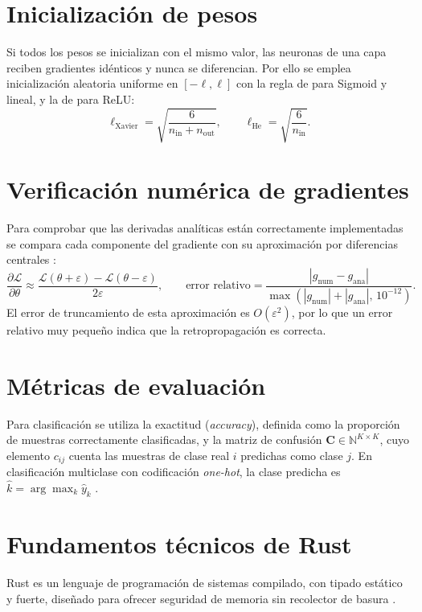 \section{Inicialización de pesos}
Si todos los pesos se inicializan con el mismo valor, las neuronas de una capa reciben gradientes idénticos y nunca se diferencian. Por ello se emplea inicialización aleatoria uniforme en $[-\ell,\ell]$ con la regla de \citet{glorot2010} para Sigmoid y lineal, y la de \citet{he2015} para ReLU:
\begin{equation}
\ell_{\text{Xavier}} = \sqrt{\frac{6}{n_{\text{in}}+n_{\text{out}}}}, \qquad \ell_{\text{He}} = \sqrt{\frac{6}{n_{\text{in}}}}.\label{eq:init}
\end{equation}

\section{Verificación numérica de gradientes}
Para comprobar que las derivadas analíticas están correctamente implementadas se compara cada componente del gradiente con su aproximación por diferencias centrales \citep{lecun1998,goodfellow2016}:
\begin{equation}
\frac{\partial\mathcal{L}}{\partial\theta} \approx \frac{\mathcal{L}(\theta+\varepsilon)-\mathcal{L}(\theta-\varepsilon)}{2\varepsilon}, \qquad \text{error relativo} = \frac{|g_{\text{num}}-g_{\text{ana}}|}{\max(|g_{\text{num}}|+|g_{\text{ana}}|,\,10^{-12})}.\label{eq:gradcheck}
\end{equation}
El error de truncamiento de esta aproximación es $O(\varepsilon^{2})$, por lo que un error relativo muy pequeño indica que la retropropagación es correcta.

\section{Métricas de evaluación}
Para clasificación se utiliza la exactitud (\emph{accuracy}), definida como la proporción de muestras correctamente clasificadas, y la matriz de confusión $\mathbf{C}\in\mathbb{N}^{K\times K}$, cuyo elemento $c_{ij}$ cuenta las muestras de clase real $i$ predichas como clase $j$. En clasificación multiclase con codificación \emph{one-hot}, la clase predicha es $\hat{k} = \arg\max_k \hat{y}_k$ \citep{bishop2006}.

\section{Fundamentos técnicos de Rust}
Rust es un lenguaje de programación de sistemas compilado, con tipado estático y fuerte, diseñado para ofrecer seguridad de memoria sin recolector de basura \citep{klabnik2023,matsakis2014}.

